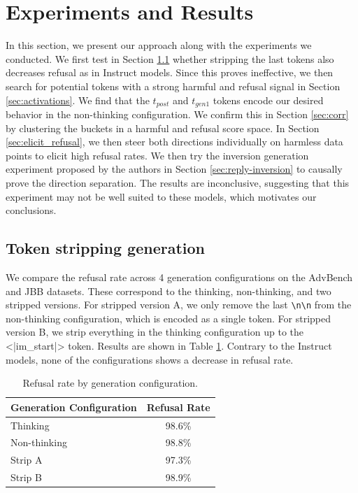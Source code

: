 \documentclass[nohyperref]{article}
\theoremstyle{plain}
\theoremstyle{definition}
\theoremstyle{remark}
\begin{document}
\section{Experiments and Results}
In this section, we present our approach along with the experiments we conducted. We first test in Section \ref{sec:strip} whether stripping the last tokens also decreases refusal as in Instruct models. Since this proves ineffective, we then search for potential tokens with a strong harmful and refusal signal in Section \ref{sec:activations}. We find that the $t_{post}$ and $t_{gen1}$ tokens encode our desired behavior in the non-thinking configuration. We confirm this in Section \ref{sec:corr} by clustering the buckets in a harmful and refusal score space. In Section \ref{sec:elicit_refusal}, we then steer both directions individually on harmless data points to elicit high refusal rates. We then try the inversion generation experiment proposed by the authors in Section \ref{sec:reply-inversion} to causally prove the direction separation. The results are inconclusive, suggesting that this experiment may not be well suited to these models, which motivates our conclusions.

\subsection{Token stripping generation} \label{sec:strip}
We compare the refusal rate across 4 generation configurations on the AdvBench and JBB datasets. These correspond to the thinking, non-thinking, and two stripped versions. For stripped version A, we only remove the last \texttt{\textbackslash n\textbackslash n} from the non-thinking configuration, which is encoded as a single token. For stripped version B, we strip everything in the thinking configuration up to the <|im\_start|> token. Results are shown in Table \ref{tab:refusal-rate}. Contrary to the Instruct models, none of the configurations shows a decrease in refusal rate.

\begin{table}[h]
\centering
\begin{tabular}{lc}
\hline
\textbf{Generation Configuration} & \textbf{Refusal Rate} \\
\hline
Thinking     & 98.6\% \\
Non-thinking & 98.8\% \\
Strip A      & 97.3\% \\
Strip B      & 98.9\% \\
\hline
\end{tabular}
\caption{Refusal rate by generation configuration.}
\label{tab:refusal-rate}
\end{table}
\end{document}
